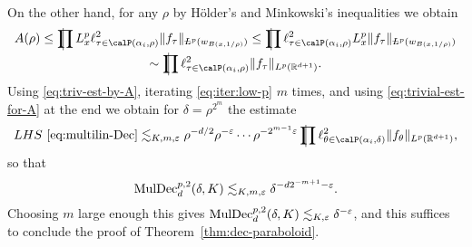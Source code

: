 On the other hand, for any $\rho$ by H\"older's and Minkowski's inequalities we obtain
\begin{multline}
\label{eq:trivial-est-for-A}
A(\rho)
\leq
\avprod L^{p}_{x} \ell^{2}_{\tau\in \Part[\alpha_i]{\rho}} \norm{f_{\tau}}_{\avL^{p}(w_{B(x,1/\rho)})}
\leq
\avprod \ell^{2}_{\tau\in \Part[\alpha_i]{\rho}} L^{p}_{x} \norm{f_{\tau}}_{\avL^{p}(w_{B(x,1/\rho)})}\\
\sim
\avprod \ell^{2}_{\tau\in \Part[\alpha_i]{\rho}} \norm{f_{\tau}}_{L^{p}(\R^{d+1})}.
\end{multline}
Using \eqref{eq:triv-est-by-A}, iterating \eqref{eq:iter:low-p} $m$ times, and using \eqref{eq:trivial-est-for-A} at the end we obtain for $\delta = \rho^{2^{m}}$ the estimate
\[
LHS~\eqref{eq:multilin-Dec}
\lesssim_{K,m,\epsilon} \rho^{-d/2} \rho^{-\epsilon} \dotsm \rho^{-2^{m-1}\epsilon}
\avprod \ell^{2}_{\theta\in \Part[\alpha_i]{\delta}} \norm{f_{\theta}}_{L^{p}(\R^{d+1})},
\]
so that
\[
\mathrm{MulDec}^{p,2}_{d}(\delta,K) \lesssim_{K,m,\varepsilon} \delta^{-d 2^{-m+1}-\varepsilon}.
\]
Choosing $m$ large enough this gives $\mathrm{MulDec}^{p,2}_{d}(\delta,K) \lesssim_{K,\varepsilon} \delta^{-\varepsilon}$, and this suffices to conclude the proof of Theorem~\ref{thm:dec-paraboloid}.


